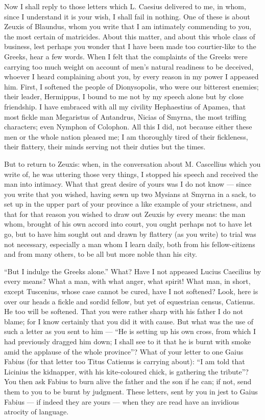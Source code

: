  Now I shall reply to those letters which L. Caesius delivered to me, in whom, since I understand it is your wish, I shall fail in nothing. One of these is about Zeuxis of Blaundus, whom you write that I am intimately commending to you, the most certain of matricides. About this matter, and about this whole class of business, lest perhaps you wonder that I have been made too courtier-like to the Greeks, hear a few words. When I felt that the complaints of the Greeks were carrying too much weight on account of men's natural readiness to be deceived, whoever I heard complaining about you, by every reason in my power I appeased him. First, I softened the people of Dionysopolis, who were our bitterest enemies; their leader, Hermippus, I bound to me not by my speech alone but by close friendship. I have embraced with all my civility Hephaestius of Apamea, that most fickle man Megaristus of Antandrus, Nicias of Smyrna, the most trifling characters; even Nymphon of Colophon. All this I did, not because either these men or the whole nation pleased me; I am thoroughly tired of their fickleness, their flattery, their minds serving not their duties but the times.

 But to return to Zeuxis: when, in the conversation about M. Cascellius which you write of, he was uttering those very things, I stopped his speech and received the man into intimacy. What that great desire of yours was I do not know --- since you write that you wished, having sewn up two Mysians at Smyrna in a sack, to set up in the upper part of your province a like example of your strictness, and that for that reason you wished to draw out Zeuxis by every means: the man whom, brought of his own accord into court, you ought perhaps not to have let go, but to have him sought out and drawn by flattery (as you write) to trial was not necessary, especially a man whom I learn daily, both from his fellow-citizens and from many others, to be all but more noble than his city.

 ``But I indulge the Greeks alone.'' What? Have I not appeased Lucius Caecilius by every means? What a man, with what anger, what spirit! What man, in short, except Tuscenius, whose case cannot be cured, have I not softened? Look, here is over our heads a fickle and sordid fellow, but yet of equestrian census, Catienus. He too will be softened. That you were rather sharp with his father I do not blame; for I know certainly that you did it with cause. But what was the use of such a letter as you sent to him --- ``He is setting up his own cross, from which I had previously dragged him down; I shall see to it that he is burnt with smoke amid the applause of the whole province''? What of your letter to one Gaius Fabius (for that letter too Titus Catienus is carrying about): ``I am told that Licinius the kidnapper, with his kite-coloured chick, is gathering the tribute''? You then ask Fabius to burn alive the father and the son if he can; if not, send them to you to be burnt by judgment. These letters, sent by you in jest to Gaius Fabius --- if indeed they are yours --- when they are read have an invidious atrocity of language.

